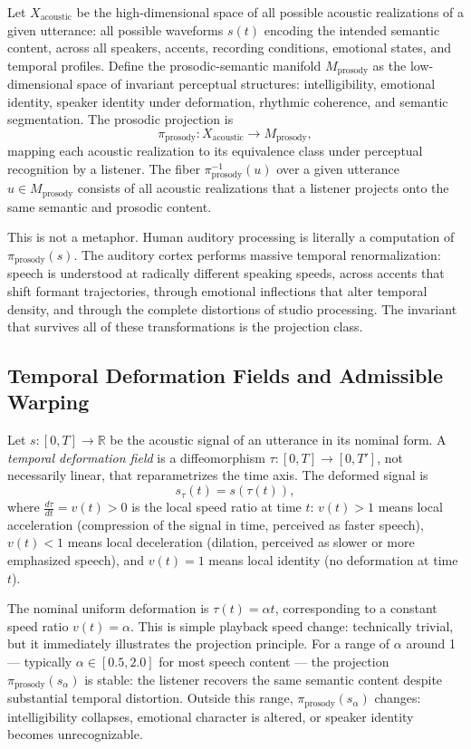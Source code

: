 \documentclass[12pt, a4paper]{article}
\theoremstyle{essaystyle}
\begin{document}
Let $X_{\mathrm{acoustic}}$ be the high-dimensional space of all possible acoustic
realizations of a given utterance: all possible waveforms $s(t)$ encoding the intended
semantic content, across all speakers, accents, recording conditions, emotional states,
and temporal profiles. Define the prosodic-semantic manifold
$M_{\mathrm{prosody}}$ as the low-dimensional space of invariant perceptual structures:
intelligibility, emotional identity, speaker identity under deformation, rhythmic
coherence, and semantic segmentation. The prosodic projection is
\[
\pi_{\mathrm{prosody}} : X_{\mathrm{acoustic}} \longrightarrow M_{\mathrm{prosody}},
\]
mapping each acoustic realization to its equivalence class under perceptual recognition
by a listener. The fiber $\pi_{\mathrm{prosody}}^{-1}(u)$ over a given utterance
$u \in M_{\mathrm{prosody}}$ consists of all acoustic realizations that a listener
projects onto the same semantic and prosodic content.

This is not a metaphor. Human auditory processing is literally a computation of
$\pi_{\mathrm{prosody}}(s)$. The auditory cortex performs massive temporal
renormalization: speech is understood at radically different speaking speeds, across
accents that shift formant trajectories, through emotional inflections that alter
temporal density, and through the complete distortions of studio processing. The
invariant that survives all of these transformations is the projection class.

\subsection{Temporal Deformation Fields and Admissible Warping}

Let $s : [0, T] \to \mathbb{R}$ be the acoustic signal of an utterance in its nominal
form. A \emph{temporal deformation field} is a diffeomorphism $\tau : [0, T] \to [0, T']$,
not necessarily linear, that reparametrizes the time axis. The deformed signal is
\[
s_\tau(t) = s(\tau(t)),
\]
where $\frac{d\tau}{dt} = v(t) > 0$ is the local speed ratio at time $t$: $v(t) > 1$
means local acceleration (compression of the signal in time, perceived as faster
speech), $v(t) < 1$ means local deceleration (dilation, perceived as slower or more
emphasized speech), and $v(t) = 1$ means local identity (no deformation at time $t$).

The nominal uniform deformation is $\tau(t) = \alpha t$, corresponding to a constant
speed ratio $v(t) = \alpha$. This is simple playback speed change: technically trivial,
but it immediately illustrates the projection principle. For a range of $\alpha$ around
1 --- typically $\alpha \in [0.5, 2.0]$ for most speech content --- the projection
$\pi_{\mathrm{prosody}}(s_\alpha)$ is stable: the listener recovers the same semantic
content despite substantial temporal distortion. Outside this range,
$\pi_{\mathrm{prosody}}(s_\alpha)$ changes: intelligibility collapses,
emotional character is altered, or speaker identity becomes unrecognizable.
\end{document}
